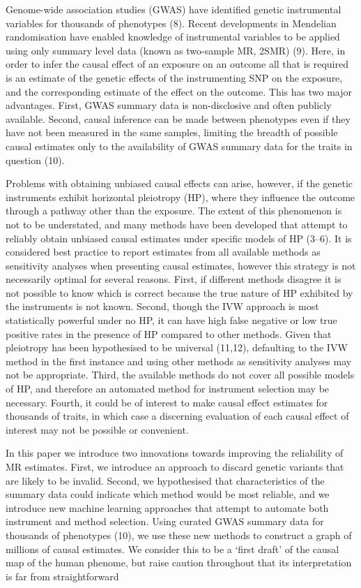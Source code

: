 \documentclass[]{article}
\begin{document}
Genome-wide association studies (GWAS) have identified genetic
instrumental variables for thousands of phenotypes (8). Recent
developments in Mendelian randomisation have enabled knowledge of
instrumental variables to be applied using only summary level data
(known as two-sample MR, 2SMR) (9). Here, in order to infer the causal
effect of an exposure on an outcome all that is required is an estimate
of the genetic effects of the instrumenting SNP on the exposure, and the
corresponding estimate of the effect on the outcome. This has two major
advantages. First, GWAS summary data is non-disclosive and often
publicly available. Second, causal inference can be made between
phenotypes even if they have not been measured in the same samples,
limiting the breadth of possible causal estimates only to the
availability of GWAS summary data for the traits in question (10).

Problems with obtaining unbiased causal effects can arise, however, if
the genetic instruments exhibit horizontal pleiotropy (HP), where they
influence the outcome through a pathway other than the exposure. The
extent of this phenomenon is not to be understated, and many methods
have been developed that attempt to reliably obtain unbiased causal
estimates under specific models of HP (3--6). It is considered best
practice to report estimates from all available methods as sensitivity
analyses when presenting causal estimates, however this strategy is not
necessarily optimal for several reasons. First, if different methods
disagree it is not possible to know which is correct because the true
nature of HP exhibited by the instruments is not known. Second, though
the IVW approach is most statistically powerful under no HP, it can have
high false negative or low true positive rates in the presence of HP
compared to other methods. Given that pleiotropy has been hypothesised
to be universal (11,12), defaulting to the IVW method in the first
instance and using other methods as sensitivity analyses may not be
appropriate. Third, the available methods do not cover all possible
models of HP, and therefore an automated method for instrument selection
may be necessary. Fourth, it could be of interest to make causal effect
estimates for thousands of traits, in which case a discerning evaluation
of each causal effect of interest may not be possible or convenient.

In this paper we introduce two innovations towards improving the
reliability of MR estimates. First, we introduce an approach to discard
genetic variants that are likely to be invalid. Second, we hypothesised
that characteristics of the summary data could indicate which method
would be most reliable, and we introduce new machine learning approaches
that attempt to automate both instrument and method selection. Using
curated GWAS summary data for thousands of phenotypes (10), we use these
new methods to construct a graph of millions of causal estimates. We
consider this to be a `first draft' of the causal map of the human
phenome, but raise caution throughout that its interpretation is far
from straightforward
\end{document}
